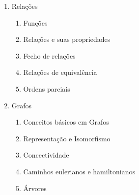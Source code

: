 \begin{enumerate}
\item Rela\c{c}\~oes
\begin{enumerate}
\item Fun\c{c}\~oes
\item Rela\c{c}\~oes e suas propriedades
\item Fecho de rela\c{c}\~oes
\item Rela\c{c}\~oes de equival\^encia
\item Ordens parciais
\end{enumerate}

\item Grafos
\begin{enumerate}
\item Conceitos b\'asicos em Grafos
\item Representa\c{c}\~ao e Isomorfismo
\item Concectividade
\item Caminhos eulerianos e hamiltonianos
\item \'Arvores
\end{enumerate}
\end{enumerate}
